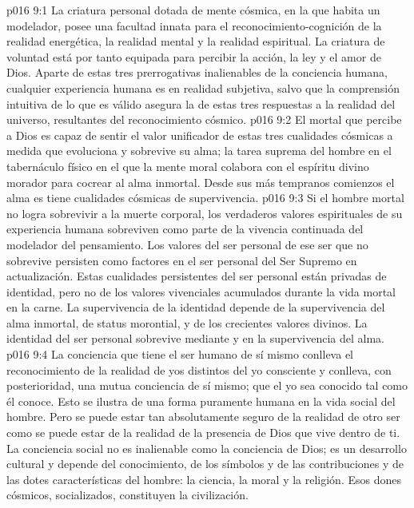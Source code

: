 \vs p016 9:1 La criatura personal dotada de mente cósmica, en la que habita un modelador, posee una facultad innata para el reconocimiento\hyp{}cognición de la realidad energética, la realidad mental y la realidad espiritual. La criatura de voluntad está por tanto equipada para percibir la acción, la ley y el amor de Dios. Aparte de estas tres prerrogativas inalienables de la conciencia humana, cualquier experiencia humana es en realidad subjetiva, salvo que la comprensión intuitiva de lo que es válido asegura la  de estas tres respuestas a la realidad del universo, resultantes del reconocimiento cósmico.
\vs p016 9:2 El mortal que percibe a Dios es capaz de sentir el valor unificador de estas tres cualidades cósmicas a medida que evoluciona y sobrevive su alma; la tarea suprema del hombre en el tabernáculo físico en el que la mente moral colabora con el espíritu divino morador para cocrear al alma inmortal. Desde sus más tempranos comienzos el alma es  tiene cualidades cósmicas de supervivencia.
\vs p016 9:3 Si el hombre mortal no logra sobrevivir a la muerte corporal, los verdaderos valores espirituales de su experiencia humana sobreviven como parte de la vivencia continuada del modelador del pensamiento. Los valores del ser personal de ese ser que no sobrevive persisten como factores en el ser personal del Ser Supremo en actualización. Estas cualidades persistentes del ser personal están privadas de identidad, pero no de los valores vivenciales acumulados durante la vida mortal en la carne. La supervivencia de la identidad depende de la supervivencia del alma inmortal, de status morontial, y de los crecientes valores divinos. La identidad del ser personal sobrevive mediante y en la supervivencia del alma.
\vs p016 9:4 \pc La conciencia que tiene el ser humano de sí mismo conlleva el reconocimiento de la realidad de yos distintos del yo consciente y conlleva, con posterioridad, una mutua conciencia de sí mismo; que el yo sea conocido tal como él conoce. Esto se ilustra de una forma puramente humana en la vida social del hombre. Pero se puede estar tan absolutamente seguro de la realidad de otro ser como se puede estar de la realidad de la presencia de Dios que vive dentro de ti. La conciencia social no es inalienable como la conciencia de Dios; es un desarrollo cultural y depende del conocimiento, de los símbolos y de las contribuciones y de las dotes características del hombre: la ciencia, la moral y la religión. Esos dones cósmicos, socializados, constituyen la civilización.
